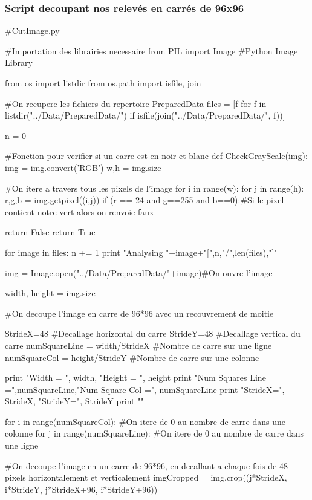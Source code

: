 \documentclass[a4paper, 12pt, titlepage, oneside, french]{article}
\begin{document}
\subsubsection{Script decoupant nos relevés en carrés de 96x96}


\begin{spverbatim}
#CutImage.py

#Importation des librairies necessaire
from PIL import Image #Python Image Library

from os import listdir
from os.path import isfile, join

#On recupere les fichiers du repertoire PreparedData
files = [f for f in listdir("../Data/PreparedData/") if isfile(join("../Data/PreparedData/", f))]


n = 0

#Fonction pour verifier si un carre est en noir et blanc
def CheckGrayScale(img):
    img = img.convert('RGB')
    w,h = img.size

    #On itere a travers tous les pixels de l'image
    for i in range(w):
        for j in range(h):
            r,g,b = img.getpixel((i,j))
            if (r == 24 and g==255 and b==0):#Si le pixel contient notre vert alors on renvoie faux

                return False
    return True

for image in files:
    n += 1
    print "Analysing "+image+"[",n,"/",len(files),"]"

    img = Image.open("../Data/PreparedData/"+image)#On ouvre l'image

    width, height = img.size

    #On decoupe l'image en carre de 96*96 avec un recouvrement de moitie

    StrideX=48 #Decallage horizontal du carre
    StrideY=48 #Decallage vertical du carre
    numSquareLine = width/StrideX #Nombre de carre sur une ligne
    numSquareCol = height/StrideY #Nombre de carre sur une colonne

    print "Width = ", width, "Height =  ", height
    print "Num Squares Line =",numSquareLine,"Num Square Col =", numSquareLine
    print "StrideX=", StrideX, "StrideY=", StrideY
    print "\n"

    for i in range(numSquareCol): #On itere de 0 au nombre de carre dans une colonne
        for j in range(numSquareLine): #On itere de 0 au nombre de carre dans une ligne
            
	    #On decoupe l'image en un carre de 96*96, en decallant a chaque fois de 48 pixels horizontalement et verticalement
	    imgCropped = img.crop((j*StrideX, i*StrideY, 
	    j*StrideX+96, i*StrideY+96))


\end{spverbatim}
\end{document}
